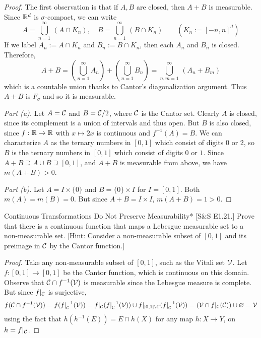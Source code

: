 \begin{proof}
    The first observation is that if \(A,B\) are closed, then \(A+B\) is measurable. Since \(\mathbb{R}^d\) is \(\sigma\)-compact, we can write 
    \[
    A = \bigcup_{n=1}^\infty \, (A \cap K_n), \quad B = \bigcup_{n=1}^\infty \, (B \cap K_n) \qquad (K_n := [-n, n]^d)
    \]
    If we label \(A_n := A \cap K_n\) and \(B_n := B \cap K_n\), then each \(A_n\) and \(B_n\) is closed. Therefore, 
    \[
    A + B
    = \left( \bigcup_{n=1}^\infty A_n \right) + \left( \bigcup_{n=1}^\infty B_n \right)
    = \bigcup_{n, m=1}^\infty \, (A_n + B_m)
    \]
    which is a countable union thanks to Cantor's diagonalization argument. Thus \(A+B\) is \(F_\sigma\) and so it is measurable. 

    \emph{Part (a).} Let \(A = \mathcal{C}\) and \(B = \mathcal{C} / 2\), where \(\mathcal{C}\) is the Cantor set. Clearly \(A\) is closed, since its complement is a union of intervals and thus open. But \(B\) is also closed, since \(f : \mathbb{R} \to \mathbb{R}\) with \(x \mapsto 2x\) is continuous and \(f^{-1}(A) = B\). We can characterize \(A\) as the ternary numbers in \([0,1]\) which consist of digits \(0\) or \(2\), so \(B\) is the ternary numbers in \([0,1]\) which consist of digits \(0\) or \(1\). Since \(A+B \supseteq A \cup B \supseteq [0,1]\), and \(A+B\) is measurable from above, we have \(m(A+B) > 0\). 

    \emph{Part (b).} Let \(A = I \times \{0\}\) and \(B = \{0\} \times I\) for \(I = [0,1]\). Both \(m(A) = m(B) = 0\). But since \(A+B = I \times I\), \(m(A+B) = 1 > 0\). 
\end{proof}

\begin{problem}{Continuous Transformations Do Not Preserve Measurability}*
    [S\&S E1.21.] Prove that there is a continuous function that maps a Lebesgue measurable set to a non-measurable set. [Hint: Consider a non-measurable subset of \([0,1]\) and its preimage in \(\mathcal{C}\) by the Cantor function.]
\end{problem}

\begin{proof}
    Take any non-measurable subset of \([0,1]\), such as the Vitali set \(\mathcal{V}\). Let \(f : [0,1] \to [0,1]\) be the Cantor function, which is continuous on this domain. Observe that \(\mathcal{C} \cap f^{-1}(\mathcal{V})\) is measurable since the Lebesgue measure is complete. But since \(f \vert_{\mathcal{C}}\) is surjective, 
    \[
    f(\mathcal{C} \cap f^{-1}(\mathcal{V}))
    = f(f\vert_{\mathcal{C}}^{-1}(\mathcal{V}))
    = f\vert_{\mathcal{C}}(f\vert_{\mathcal{C}}^{-1}(\mathcal{V})) \cup f\vert_{[0,1] \setminus \mathcal{C}} (f\vert_{\mathcal{C}}^{-1}(\mathcal{V}))
    = (\mathcal{V} \cap f\vert_{\mathcal{C}}(\mathcal{C})) \cup \varnothing
     = \mathcal{V}
    \]
    using the fact that \(h(h^{-1}(E)) = E \cap h(X)\) for any map \(h : X \to Y\), on \(h = f\vert_{\mathcal{C}}\). 
\end{proof}

